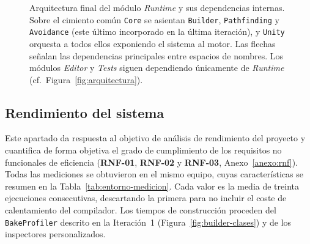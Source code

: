 \begin{figure}[htp]
  \caption[Arquitectura final del módulo \textit{Runtime} y sus dependencias internas.]
  {Arquitectura final del módulo \textit{Runtime} y sus dependencias internas.
  Sobre el cimiento común \texttt{Core} se asientan \texttt{Builder}, \texttt{Pathfinding} y \texttt{Avoidance} (este último incorporado en la última iteración), y \texttt{Unity} orquesta a todos ellos exponiendo el sistema al motor.
  Las flechas señalan las dependencias principales entre espacios de nombres. Los módulos \textit{Editor} y \textit{Tests} siguen dependiendo únicamente de \textit{Runtime} (cf.\ Figura~\ref{fig:arquitectura}).}
  \label{fig:arquitectura-final}
\end{figure}

\subsection{Rendimiento del sistema}
\label{sec:mediciones}

Este apartado da respuesta al objetivo de análisis de rendimiento del proyecto y cuantifica de forma objetiva el grado de cumplimiento de los requisitos no funcionales de eficiencia (\textbf{RNF-01}, \textbf{RNF-02} y \textbf{RNF-03}, Anexo~\ref{anexo:rnf}).
Todas las mediciones se obtuvieron en el mismo equipo, cuyas características se resumen en la Tabla~\ref{tab:entorno-medicion}.
Cada valor es la media de treinta ejecuciones consecutivas, descartando la primera para no incluir el coste de calentamiento del compilador.
Los tiempos de construcción proceden del \texttt{BakeProfiler} descrito en la Iteración~1 (Figura~\ref{fig:builder-clases}) y de los inspectores personalizados.

